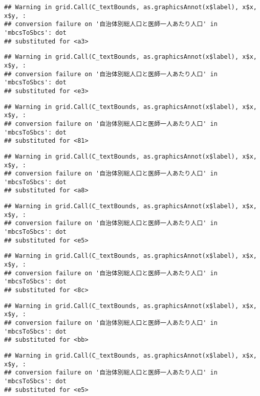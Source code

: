 \documentclass[
]{article}
\begin{document}
\begin{verbatim}
## Warning in grid.Call(C_textBounds, as.graphicsAnnot(x$label), x$x, x$y, :
## conversion failure on '自治体別総人口と医師一人あたり人口' in 'mbcsToSbcs': dot
## substituted for <a3>
\end{verbatim}

\begin{verbatim}
## Warning in grid.Call(C_textBounds, as.graphicsAnnot(x$label), x$x, x$y, :
## conversion failure on '自治体別総人口と医師一人あたり人口' in 'mbcsToSbcs': dot
## substituted for <e3>
\end{verbatim}

\begin{verbatim}
## Warning in grid.Call(C_textBounds, as.graphicsAnnot(x$label), x$x, x$y, :
## conversion failure on '自治体別総人口と医師一人あたり人口' in 'mbcsToSbcs': dot
## substituted for <81>
\end{verbatim}

\begin{verbatim}
## Warning in grid.Call(C_textBounds, as.graphicsAnnot(x$label), x$x, x$y, :
## conversion failure on '自治体別総人口と医師一人あたり人口' in 'mbcsToSbcs': dot
## substituted for <a8>
\end{verbatim}

\begin{verbatim}
## Warning in grid.Call(C_textBounds, as.graphicsAnnot(x$label), x$x, x$y, :
## conversion failure on '自治体別総人口と医師一人あたり人口' in 'mbcsToSbcs': dot
## substituted for <e5>
\end{verbatim}

\begin{verbatim}
## Warning in grid.Call(C_textBounds, as.graphicsAnnot(x$label), x$x, x$y, :
## conversion failure on '自治体別総人口と医師一人あたり人口' in 'mbcsToSbcs': dot
## substituted for <8c>
\end{verbatim}

\begin{verbatim}
## Warning in grid.Call(C_textBounds, as.graphicsAnnot(x$label), x$x, x$y, :
## conversion failure on '自治体別総人口と医師一人あたり人口' in 'mbcsToSbcs': dot
## substituted for <bb>
\end{verbatim}

\begin{verbatim}
## Warning in grid.Call(C_textBounds, as.graphicsAnnot(x$label), x$x, x$y, :
## conversion failure on '自治体別総人口と医師一人あたり人口' in 'mbcsToSbcs': dot
## substituted for <e5>
\end{verbatim}
\end{document}
